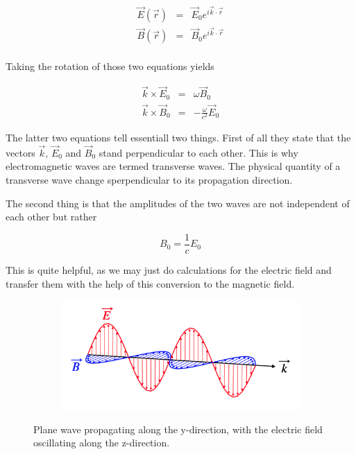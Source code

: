 \documentclass[
  a4paper,
]{book}
\begin{document}
\begin{eqnarray}
\vec{E}(\vec{r})&=&\vec{E}_{0}e^{i\vec{k}\cdot\vec{r}}\\
\vec{B}(\vec{r})&=&\vec{B}_{0}e^{i\vec{k}\cdot\vec{r}}\\
\end{eqnarray}

Taking the rotation of those two equations yields

\begin{eqnarray}
\vec{k}\times \vec{E}_{0}&=&\omega \vec{B}_0\\
\vec{k}\times \vec{B}_{0}&=&-\frac{\omega}{c^2} \vec{E}_0
\end{eqnarray}

The latter two equations tell essentiall two things. First of all they
state that the vectors \(\vec{k}\), \(\vec{E}_0\) and \(\vec{B}_{0}\)
stand perpendicular to each other. This is why electromagnetic waves are
termed transverse waves. The physical quantity of a transverse wave
change sperpendicular to its propagation direction.

The second thing is that the amplitudes of the two waves are not
independent of each other but rather

\[
B_0=\frac{1}{c}E_0
\]

This is quite helpful, as we may just do calculations for the electric
field and transfer them with the help of this conversion to the magnetic
field.

\begin{figure}

\begin{minipage}{\linewidth}

\begin{figure}[H]

{\centering \includegraphics[width=0.9\linewidth,height=\textheight,keepaspectratio]{electromagnetic-waves/img/plane_wave.png}

}


\end{figure}%

\end{minipage}%
\newline
\begin{minipage}{\linewidth}
Plane wave propagating along the y-direction, with the electric field
oscillating along the z-direction.\end{minipage}%

\end{figure}%
\end{document}
